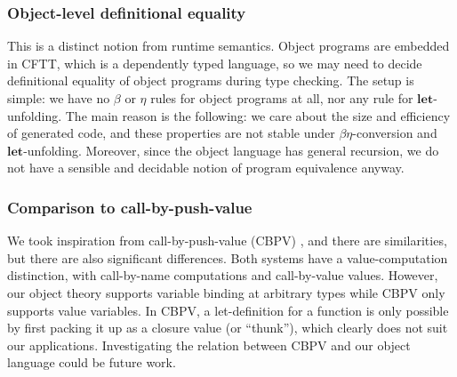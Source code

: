 \documentclass[acmsmall,screen,review,anonymous]{acmart}
\newcommand{\mbf}[1]{{\mathbf{#1}}}
\theoremstyle{remark}
\begin{document}
\subsubsection{Object-level definitional equality} This is a distinct notion
from runtime semantics. Object programs are embedded in CFTT, which is a
dependently typed language, so we may need to decide definitional equality of
object programs during type checking. The setup is simple: we have no $\beta$ or
$\eta$ rules for object programs at all, nor any rule for $\mbf{let}$-unfolding.
The main reason is the following: we care about the size and efficiency of
generated code, and these properties are not stable under $\beta\eta$-conversion
and $\mbf{let}$-unfolding. Moreover, since the object language has general
recursion, we do not have a sensible and decidable notion of program equivalence
anyway.

\subsubsection{Comparison to call-by-push-value}
We took inspiration from call-by-push-value (CBPV) \cite{DBLP:conf/tlca/Levy99},
and there are similarities, but there are also significant differences. Both
systems have a value-computation distinction, with call-by-name computations and
call-by-value values. However, our object theory supports variable binding at
arbitrary types while CBPV only supports value variables. In CBPV, a
let-definition for a function is only possible by first packing it up as a
closure value (or ``thunk''), which clearly does not suit our applications.
Investigating the relation between CBPV and our object language could be future work.

\end{document}
